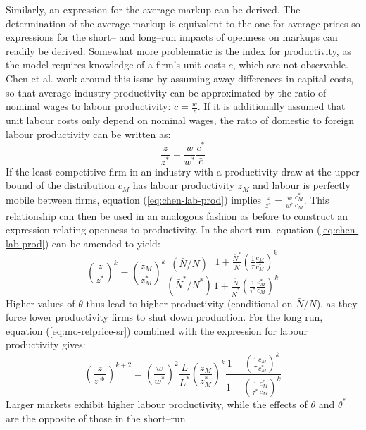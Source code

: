 Similarly, an expression for the average markup can be derived. The determination of the average markup is equivalent to the one for average prices so expressions for the short-- and long--run impacts of openness on markups can readily be derived. Somewhat more problematic is the index for productivity, as the model requires knowledge of a firm's unit costs $c$, which are not observable. Chen et al. work around this issue by assuming away differences in capital costs, so that average industry productivity can be approximated by the ratio of nominal wages to labour productivity: $\bar{c} = \frac{w}{z}$. If it is additionally assumed that unit labour costs only depend on nominal wages, the ratio of domestic to foreign labour productivity can be written as:
\begin{equation}\label{eq:chen-lab-prod}
\frac{z}{z^*} = \frac{w}{w^*} \frac{\bar{c}^*}{\bar{c}}
\end{equation}
If the least competitive firm in an industry with a productivity draw at the upper bound of the distribution $c_M$ has labour productivity $z_M$ and labour is perfectly mobile between firms, equation (\ref{eq:chen-lab-prod}) implies $\frac{z}{z^*} = \frac{w}{w^*} \frac{c_M^*}{c_M}$. This relationship can then be used in an analogous fashion as before to construct an expression relating openness to productivity. In the short run, equation (\ref{eq:chen-lab-prod}) can be amended to yield:
\begin{equation}\label{eq:chen-prod-sr}
\left( \frac{z}{z^*} \right)^k = \left( \frac{z_M}{z_M^*} \right)^k \frac{(\bar{N}/N)}{(\bar{N}^*/N^*)} \frac{1+ \frac{\bar{N}^*}{\bar{N}} \left(\frac{1}{\tau}\frac{c_M}{c_M^*}\right)^k}{1+ \frac{\bar{N}}{\bar{N}^*} \left(\frac{1}{\tau^*} \frac{c_M^*}{c_M}\right)^k} 
\end{equation}
Higher values of $\theta$ thus lead to higher productivity (conditional on $\bar{N}/N$), as they force lower productivity firms to shut down production. For the long run, equation (\ref{eq:mo-relprice-sr}) combined with the expression for labour productivity gives:
\begin{equation}\label{eq:chen-prod-lr}
\left( \frac{z}{z*} \right)^{k+2} = \left( \frac{w}{w^*} \right)^2 \frac{L}{L^*} \left( \frac{z_M}{z_M^*} \right)^k \frac{1-\left(\frac{1}{\tau} \frac{c_M}{c_M^*}\right)^k}{1-\left(\frac{1}{\tau^*} \frac{c_M^*}{c_M}\right)^k}
\end{equation} 
Larger markets exhibit higher labour productivity, while the effects of $\theta$ and $\theta^*$ are the opposite of those in the short--run.

